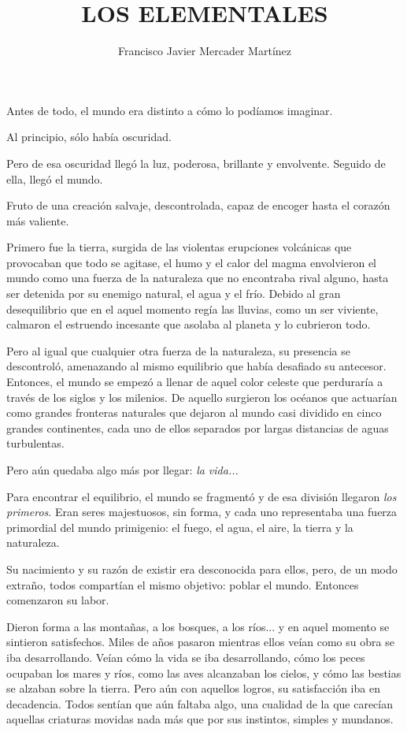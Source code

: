 \documentclass[12pt, a4paper]{book}
\title{\textbf{LOS ELEMENTALES}}
\date{}
\author{Francisco Javier Mercader Martínez}
\begin{document}
\maketitle
\chapter{}
Antes de todo, el mundo era distinto a cómo lo podíamos imaginar. 

Al principio, sólo había oscuridad.

Pero de esa oscuridad llegó la luz, poderosa, brillante y envolvente. Seguido de ella, llegó el mundo. 

Fruto de una creación salvaje, descontrolada, capaz de encoger hasta el corazón más valiente. 

Primero fue la tierra, surgida de las violentas erupciones volcánicas que provocaban que todo se agitase, el humo y el calor del magma  envolvieron el mundo como una fuerza de la naturaleza que no encontraba rival alguno, hasta ser detenida por su enemigo natural, el agua y el frío. Debido al gran desequilibrio que en el aquel momento regía las lluvias, como un ser viviente, calmaron el estruendo incesante que asolaba al planeta y lo cubrieron todo. 

Pero al igual que cualquier otra fuerza de la naturaleza, su presencia se descontroló, amenazando al mismo equilibrio que había desafiado su antecesor. Entonces, el mundo se empezó a llenar de aquel color celeste que perduraría a través de los siglos y los milenios. De aquello surgieron los océanos que actuarían como grandes fronteras naturales que dejaron al mundo casi dividido en cinco grandes continentes, cada uno de ellos separados por largas distancias de aguas turbulentas.

Pero aún quedaba algo más por llegar: \emph{la vida...}

Para encontrar el equilibrio, el mundo se fragmentó y de esa división llegaron \textit{los primeros}. Eran seres majestuosos, sin forma, y cada uno representaba una fuerza primordial del mundo primigenio: el fuego, el agua, el aire, la tierra y la naturaleza.

Su nacimiento y su razón de existir era desconocida para ellos, pero, de un modo extraño, todos compartían el mismo objetivo: poblar el mundo. Entonces comenzaron su labor.

Dieron forma a las montañas, a los bosques, a los ríos... y en aquel momento se sintieron satisfechos. Miles de años pasaron mientras ellos veían como su obra se iba desarrollando. Veían cómo la vida se iba desarrollando, cómo los peces ocupaban los mares y ríos, como las aves alcanzaban los cielos, y cómo las bestias se alzaban sobre la tierra. Pero aún con aquellos logros, su satisfacción iba en decadencia. Todos sentían que aún faltaba algo, una cualidad de la que carecían aquellas criaturas movidas nada más que por sus instintos, simples y mundanos.
\end{document}
